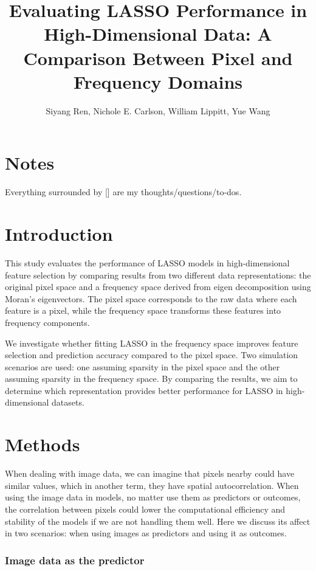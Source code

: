 \documentclass[12pt]{article}
\begin{document}
\title{Evaluating LASSO Performance in High-Dimensional Data: A Comparison Between Pixel and Frequency Domains}
\author{Siyang Ren, Nichole E. Carlson, William Lippitt, Yue Wang}
\date{}
\maketitle


\section*{Notes}

Everything surrounded by [] are my thoughts/questions/to-dos.


\section*{Introduction}

This study evaluates the performance of LASSO models in high-dimensional feature selection by comparing results from two different data representations: the original pixel space and a frequency space derived from eigen decomposition using Moran’s eigenvectors. The pixel space corresponds to the raw data where each feature is a pixel, while the frequency space transforms these features into frequency components.

We investigate whether fitting LASSO in the frequency space improves feature selection and prediction accuracy compared to the pixel space. Two simulation scenarios are used: one assuming sparsity in the pixel space and the other assuming sparsity in the frequency space. By comparing the results, we aim to determine which representation provides better performance for LASSO in high-dimensional datasets.


\section*{Methods}

When dealing with image data, we can imagine that pixels nearby could have similar values, which in another term, they have spatial autocorrelation. When using the image data in models, no matter use them as predictors or outcomes, the correlation between pixels could lower the computational efficiency and stability of the models if we are not handling them well. Here we discuss its affect in two scenarios: when using images as predictors and using it as outcomes.

\subsubsection*{Image data as the predictor}
\end{document}
